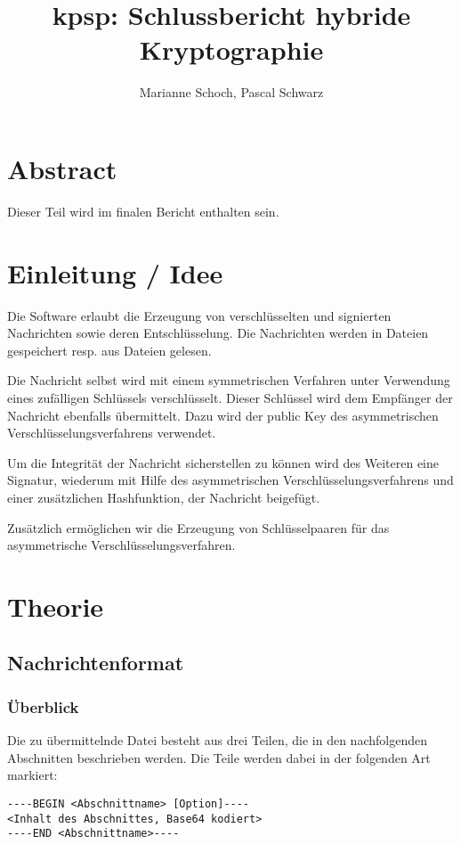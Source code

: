 \documentclass[11pt,a4paper,parskip=half]{scrartcl}
\title{kpsp: Schlussbericht hybride Kryptographie}
\author{Marianne Schoch, Pascal Schwarz}
\begin{document}
\maketitle

\section{Abstract}
Dieser Teil wird im finalen Bericht enthalten sein.

\section{Einleitung / Idee}
Die Software erlaubt die Erzeugung von verschlüsselten und signierten Nachrichten sowie deren Entschlüsselung. Die Nachrichten werden in Dateien gespeichert resp. aus Dateien gelesen.

Die Nachricht selbst wird mit einem symmetrischen Verfahren unter Verwendung eines zufälligen Schlüssels verschlüsselt. Dieser Schlüssel wird dem Empfänger der Nachricht ebenfalls übermittelt. Dazu wird der public Key des asymmetrischen Verschlüsselungsverfahrens verwendet.

Um die Integrität der Nachricht sicherstellen zu können wird des Weiteren eine Signatur, wiederum mit Hilfe des asymmetrischen Verschlüsselungsverfahrens und einer zusätzlichen Hashfunktion, der Nachricht beigefügt.

Zusätzlich ermöglichen wir die Erzeugung von Schlüsselpaaren für das asymmetrische Verschlüsselungsverfahren.

\section{Theorie}
\subsection{Nachrichtenformat}
\subsubsection{Überblick}
Die zu übermittelnde Datei besteht aus drei Teilen, die in den nachfolgenden Abschnitten beschrieben werden. Die Teile werden dabei in der folgenden Art markiert:
\begin{lstlisting}
----BEGIN <Abschnittname> [Option]----
<Inhalt des Abschnittes, Base64 kodiert>
----END <Abschnittname>----
\end{lstlisting}
\end{document}
